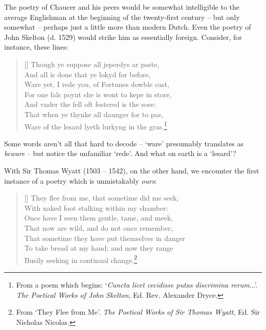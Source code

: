 \documentclass[0main.tex]{subfiles}
\begin{document}
The poetry of Chaucer and his peers would be somewhat intelligible to the average Englishman at the beginning of the twenty-first century -- but only somewhat -- perhaps just a little more than modern Dutch. Even the poetry of John Skelton (d. 1529) would strike him as essentially foreign. Consider, for instance, these lines:

\bigskip

\settowidth{\versewidth}{\footnotesize Though ye suppose all jeperdys ar paste}
\begin{verse}[\versewidth]
{\footnotesize
Though ye suppose all jeperdys ar paste,\\
\vin And all is done that ye lokyd for before,\\
Ware yet, I rede you, of Fortunes dowble cast,\\
\vin For one fals poynt she is wont to kepe in store,\\
\vin And vnder the fell oft festered is the sore:\\
That when ye thynke all daunger for to pas,\\
Ware of the lesard lyeth lurkyng in the gras.\footnote{From a poem which begins: `\emph{Cuncta licet cecidisse putas discrimina rerum}...'. \emph{The Poetical Works of John Skelton}, Ed. Rev. Alexander Dryce.}\\
}
\end{verse}

\bigskip

Some words aren't all that hard to decode -- `ware' presumably translates as \emph{beware} -- but notice the unfamiliar `rede'. And what on earth is a `lesard'?

With Sir Thomas Wyatt (1503 -- 1542), on the other hand, we encounter the first instance of a poetry which is unmistakably \emph{ours}:

\bigskip

\settowidth{\versewidth}{\footnotesize They flee from me, that sometime did me seek,}
\begin{verse}[\versewidth]
{\footnotesize
They flee from me, that sometime did me seek,\\
\vin With naked foot stalking within my chamber:\\
Once have I seen them gentle, tame, and meek,\\
\vin That now are wild, and do not once remember,\\
\vin That sometime they have put themselves in danger\\
To take bread at my hand; and now they range\\
Busily seeking in continual change.\footnote{From `They Flee from Me'. \emph{The Poetical Works of Sir Thomas Wyatt}, Ed. Sir Nicholas Nicolas.}\\
}
\end{verse}
\end{document}
